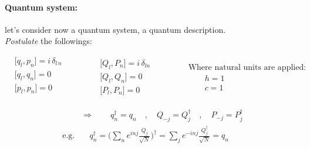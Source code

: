 \documentclass[class=article]{standalone}
\begin{document}
\paragraph{Quantum system:}  let's consider now a quantum system, a quantum description. \\
\emph{Postulate} the followings:

\begin{equation*}
\begin{split}
& \Big[ q_l , p_n \Big] = i \, \delta_{l\,n} \\
& \Big[ q_l , q_n \Big] = 0 \\
& \Big[ p_l , p_n \Big] = 0 \\
\end{split}\quad\quad\quad
\begin{split}
& \Big[ Q_l , P_n \Big] = i \, \delta_{ln} \\
& \Big[ Q_l , Q_n \Big] = 0 \\
& \Big[ P_l , P_n \Big] = 0
\end{split}\quad\quad\quad
\begin{split}
& \mbox{Where natural units are applied:} \\
& \quad\quad h = 1 \\
& \quad\quad c = 1
\end{split}
\end{equation*}

\begin{equation*}
\begin{split}
& \Rightarrow\quad\quad q_n^{\dagger} = q_n  \quad , \quad Q_{-j} = Q_{j}^{\dagger} \quad , \quad  P_{-j} = P_{j}^{\dagger} \\
\mbox{e.g.} & \quad q_n^{\dagger} = \Big( \sum_n e^{i n j} \frac{Q_j}{\sqrt{N}} \Big)^{\dagger} =  \sum_j e^{ - i n j} \frac{Q_j^{\dagger}}{\sqrt{N}} = q_n
\end{split}
\end{equation*}
\end{document}
